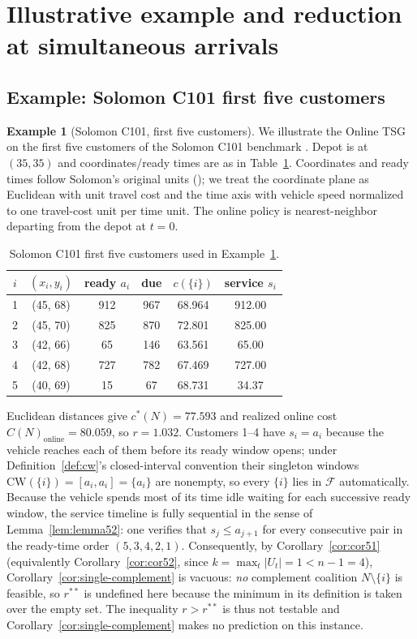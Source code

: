 \documentclass[11pt]{article}
\newcommand{\F}{\mathcal{F}}
\newcommand{\CW}{\mathrm{CW}}
\newcommand{\cstar}{c^{\ast}}
\theoremstyle{plain}
\theoremstyle{definition}
\newtheorem{example}[theorem]{Example}
\theoremstyle{remark}
\begin{document}
\section{Illustrative example and reduction at simultaneous arrivals}
\label{app:example-reduction}

\subsection{Example: Solomon C101 first five customers}

\begin{example}[Solomon C101, first five customers]
\label{ex:solomon}
We illustrate the Online TSG on the first five customers of the Solomon C101 benchmark \citep{solomon1987benchmarks}. Depot is at $(35, 35)$ and coordinates/ready times are as in Table~\ref{tab:solomon}. Coordinates and ready times follow Solomon's original units (\citealp{solomon1987benchmarks}); we treat the coordinate plane as Euclidean with unit travel cost and the time axis with vehicle speed normalized to one travel-cost unit per time unit. The online policy is nearest-neighbor departing from the depot at $t=0$.

\begin{table}[h]
\centering
\caption{Solomon C101 first five customers used in Example~\ref{ex:solomon}.}
\label{tab:solomon}
\small
\begin{tabular}{@{}cccccc@{}}
\toprule
$i$ & $(x_i, y_i)$ & ready $a_i$ & due & $c(\{i\})$ & service $s_i$ \\
\midrule
1 & (45, 68) & 912 & 967 & 68.964 & 912.00 \\
2 & (45, 70) & 825 & 870 & 72.801 & 825.00 \\
3 & (42, 66) &  65 & 146 & 63.561 &  65.00 \\
4 & (42, 68) & 727 & 782 & 67.469 & 727.00 \\
5 & (40, 69) &  15 &  67 & 68.731 &  34.37 \\
\bottomrule
\end{tabular}
\end{table}

Euclidean distances give $\cstar(N)=77.593$ and realized online cost $C(N)_{\text{online}}=80.059$, so $r = 1.032$. Customers 1--4 have $s_i=a_i$ because the vehicle reaches each of them before its ready window opens; under Definition~\ref{def:cw}'s closed-interval convention their singleton windows $\CW(\{i\})=[a_i,a_i]=\{a_i\}$ are nonempty, so every $\{i\}$ lies in $\F$ automatically. Because the vehicle spends most of its time idle waiting for each successive ready window, the service timeline is fully sequential in the sense of Lemma~\ref{lem:lemma52}: one verifies that $s_j \le a_{j+1}$ for every consecutive pair in the ready-time order $(5,3,4,2,1)$. Consequently, by Corollary~\ref{cor:cor51} (equivalently Corollary~\ref{cor:cor52}, since $k = \max_t|U_t| = 1 < n-1=4$), Corollary~\ref{cor:single-complement} is vacuous: \emph{no} complement coalition $N\setminus\{i\}$ is feasible, so $r^{\ast\ast}$ is undefined here because the minimum in its definition is taken over the empty set. The inequality $r > r^{\ast\ast}$ is thus not testable and Corollary~\ref{cor:single-complement} makes no prediction on this instance.


\end{example}
\end{document}

